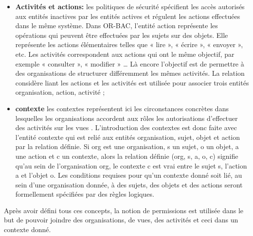 \begin{itemize}
\item \textbf{Activités et actions:} les politiques de sécurité spécifient les accès autorisés aux entités inactives par les entités actives et régulent les actions effectuées dans le même système. Dans OR-BAC, l'entité action représente les opérations qui peuvent être effectuées par les sujets sur des objets. Elle représente les actions élémentaires telles que « lire », « écrire », « envoyer », etc. Les activités correspondent aux actions qui ont le même objectif, par exemple « consulter », « modifier » … Là encore l'objectif est de permettre à des organisations de structurer différemment les mêmes activités. La relation considère liant les actions et les activités est utilisée pour associer trois entités organisation, action, activité \cite{kalam03};
\item \textbf{contexte} les contextes représentent ici les circonstances concrètes dans lesquelles les organisations accordent aux rôles les autorisations d'effectuer des activités sur les vues \cite{kalam03}. L'introduction des contextes est donc faite avec l'entité contexte qui est relié aux entités organisation, sujet, objet et action par la relation définie. Si org est une organisation, s un sujet, o un objet, a une action et c un contexte, alors la relation définie (org, s, a, o, c) signifie qu'au sein de l'organisation org, le contexte c est vrai entre le sujet s, l'action a et l'objet o. Les conditions requises pour qu'un contexte donné soit lié, au sein d'une organisation donnée, à des sujets, des objets et des actions seront formellement spécifiées par des règles logiques.
\end{itemize}

\hspace*{0.5cm} Après avoir défini tous ces concepts, la notion de permissions est utilisée dans le but de pouvoir joindre des organisations, de vues, des activités et ceci dans un contexte donné\cite{kalam03}.\\

